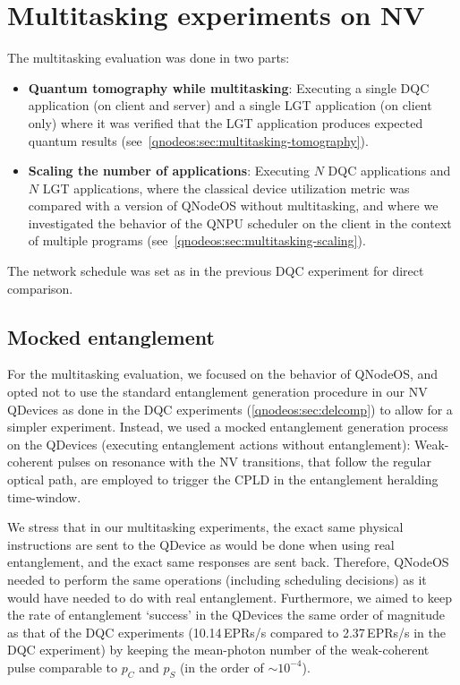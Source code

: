 \section{Multitasking experiments on NV}

The multitasking evaluation was done in two parts:
%
\begin{itemize}
    \item \textbf{Quantum tomography while multitasking}: Executing a single \ac{DQC} application (on client and server) and a single \ac{LGT} application (on client only) where it was verified that the \ac{LGT} application produces expected quantum results (see~\cref{qnodeos:sec:multitasking-tomography}).
    \item \textbf{Scaling the number of applications}: Executing $N$ \ac{DQC} applications and $N$ \ac{LGT} applications, where the classical device utilization metric was compared with a version of \ac{QNodeOS} without multitasking, and where we investigated the behavior of the \ac{QNPU} scheduler on the client in the context of multiple programs (see~\cref{qnodeos:sec:multitasking-scaling}).
\end{itemize}
%
The network schedule was set as in the previous \ac{DQC} experiment for direct comparison.

\subsection{Mocked entanglement}
\label{qnodeos:sec:mocked_entanglement}

For the multitasking evaluation, we focused on the behavior of \ac{QNodeOS}, and opted not to use the standard entanglement generation procedure in our \ac{NV} \acp{QDevice} as done in the \ac{DQC} experiments (\cref{qnodeos:sec:delcomp}) to allow for a simpler experiment. Instead, we used a mocked entanglement generation process on the \acp{QDevice} (executing entanglement actions without entanglement): Weak-coherent pulses on resonance with the \ac{NV} transitions, that follow the regular optical path, are employed to trigger the \ac{CPLD} in the entanglement heralding time-window.

We stress that in our multitasking experiments, the exact same physical instructions are sent to the \ac{QDevice} as would be done when using real entanglement, and the exact same responses are sent back. Therefore, \ac{QNodeOS} needed to perform the same operations (including scheduling decisions) as it would have needed to do with real entanglement. Furthermore, we aimed to keep the rate of entanglement `success' in the \acp{QDevice} the same order of magnitude as that of the \ac{DQC} experiments (10.14\,\acp{EPR}/s compared to 2.37\,\acp{EPR}/s in the \ac{DQC} experiment) by keeping the mean-photon number of the weak-coherent pulse comparable to $p_C$ and $p_S$ (in the order of $\sim10^{-4}$). 

